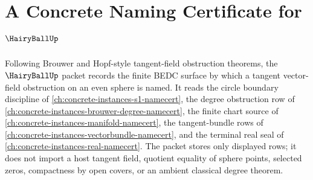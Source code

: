 \chapter{A Concrete Naming Certificate for $\HairyBallUp$}
\label{ch:concrete-instances-hairy-ball-namecert}

Following Brouwer and Hopf-style tangent-field obstruction theorems, the $\HairyBallUp$ packet records the finite BEDC surface by which a tangent vector-field obstruction on an even sphere is named. It reads the circle boundary discipline of \autoref{ch:concrete-instances-s1-namecert}, the degree obstruction row of \autoref{ch:concrete-instances-brouwer-degree-namecert}, the finite chart source of \autoref{ch:concrete-instances-manifold-namecert}, the tangent-bundle rows of \autoref{ch:concrete-instances-vectorbundle-namecert}, and the terminal real seal of \autoref{ch:concrete-instances-real-namecert}. The packet stores only displayed rows; it does not import a host tangent field, quotient equality of sphere points, selected zeros, compactness by open covers, or an ambient classical degree theorem.

